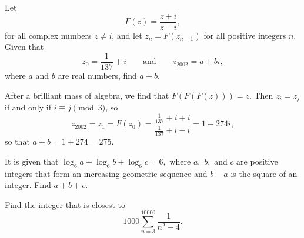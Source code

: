 \begin{question}[name={2002 AIME I, \href{https://artofproblemsolving.com/community/c4p378395}{Problem 12}}]
	Let $$F(z)=\frac{z+i}{z-i},$$ for all complex numbers $z\not= i$, and let $z_n=F(z_{n-1})$ for all positive integers $n$. Given that $$z_0=\frac 1{137}+i \qquad \text{and} \qquad z_{2002}=a+bi,$$ where $a$ and $b$ are real numbers, find $a+b$.
\end{question}


\begin{solution}[name={Solution by paladin8}]
	After a brilliant mass of algebra, we find that $F(F(F(z))) = z$. Then $z_i = z_j$ if and only if $i \equiv j \pmod{3}$, so
	$$z_{2002} = z_1 = F(z_0) = \frac{\frac{1}{137}+i+i}{\frac{1}{137}+i-i} = 1+274i,$$
	so that $ a+b = 1+274 = \boxed{275}$.
\end{solution}







\begin{question}[name={2002 AIME II, \href{https://artofproblemsolving.com/community/c4p714626}{Problem 3}}]
	It is given that $\log_{6}a+\log_{6}b+\log_{6}c=6,$ where $a,$ $b,$ and $c$ are positive integers that form an increasing geometric sequence and $b-a$ is the square of an integer. Find $a+b+c$.
\end{question}


%	













\begin{question}[name={2002 AIME II, \href{https://artofproblemsolving.com/community/c4p714630}{Problem 6}}]
	Find the integer that is closest to $$ 1000 \sum_{n=3}^{10000}\frac{1}{n^{2}-4}.$$
\end{question}


%	












